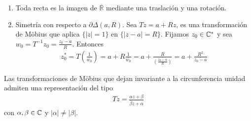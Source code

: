 \begin{ejemplo}
    \begin{enumerate}
        \item Toda recta es la imagen de $\overline{\mathbb{R}}$ mediante una traslación y una rotación.
        \item Simetría con respecto a $\partial \Delta(a,R)$. Sea $Tz = a + Rz$, es una transformación de M\"obius que aplica $\{ |z| = 1\}$ en $\{ |z-a| = R\}$. Fijamos $z_0 \in \mathbb{C}^*$ y sea $w_0 = T^{-1}z_0 = \frac{z_0 - a}{R}$. Entonces
              \begin{align*}
                  z_0^* = T\left( \frac{1}{\overline{w_0}} \right) = a + R\frac{1}{\overline{w_0}} = a + \frac{R}{\overline{\left( \frac{z_0 - a}{R} \right)}} = a + \frac{R^2}{ \overline{z_0 - a}}
              \end{align*}
    \end{enumerate}
\end{ejemplo}

\begin{teo}
    Las transformaciones de M\"obius que dejan invariante a la circunferencia unidad admiten una representación del tipo
    \begin{align*}
        Tz = \frac{\alpha z + \beta}{\overline{\beta}z + \overline{\alpha}}
    \end{align*}
    con $\alpha,\beta \in \mathbb{C}$ y $|\alpha| \not = |\beta|$.
\end{teo}

